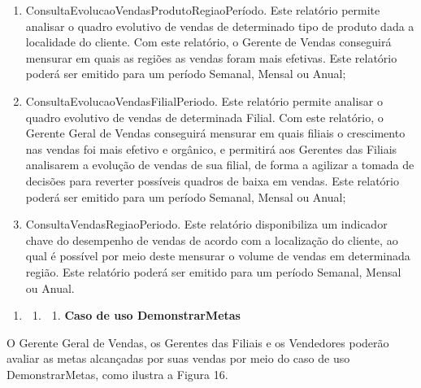 \documentclass[a4paper]{article}
\newcommand\liststyleWWviiiNumi{%
\renewcommand\theenumi{\arabic{enumi}}
\renewcommand\theenumii{\arabic{enumi}.\arabic{enumii}}
\renewcommand\theenumiii{\arabic{enumi}.\arabic{enumii}.\arabic{enumiii}}
\renewcommand\theenumiv{\arabic{enumi}.\arabic{enumii}.\arabic{enumiii}.\arabic{enumiv}}
\renewcommand\labelenumi{\theenumi}
\renewcommand\labelenumii{\theenumii}
\renewcommand\labelenumiii{\theenumiii}
\renewcommand\labelenumiv{\theenumiv.}
}
\begin{document}
\begin{enumerate}
{{vendas em tr\^es classes: A, B e C; sendo a classe A correspondente aos 20\% de produtos que obtiveram o maior volume
de vendas e correspondem \`a maior parcela do faturamento da NIB Ferragens, a classe B correspondendo aos 30\% de
produtos que tiveram um volume razo\'avel de vendas e impactaram de alguma forma mediana no faturamento da NIB
Ferragens e a classe C que corresponde aos 50\% de produtos que tiveram pouca ou nenhuma relev\^ancia no volume de
vendas da empresa. Este relat\'orio poder\'a ser emitido para um per\'iodo Semanal, Mensal ou Anual;}}
\item {
\textsf{ConsultaEvolucaoVendasProdutoRegiaoPer\'iodo. Este relat\'orio permite analisar o quadro evolutivo de vendas de
determinado tipo de produto dada a localidade do cliente. Com este relat\'orio, o Gerente de Vendas conseguir\'a
mensurar em quais as regi\~oes as vendas foram mais efetivas. Este relat\'orio poder\'a ser emitido para um per\'iodo
Semanal, Mensal ou Anual;}}
\item {
\textsf{ConsultaEvolucaoVendasFilialPeriodo. Este relat\'orio permite analisar o quadro evolutivo de vendas de
determinada Filial. Com este relat\'orio, o Gerente Geral de Vendas conseguir\'a mensurar em quais filiais o
crescimento nas vendas foi mais efetivo e org\^anico, e permitir\'a aos Gerentes das Filiais analisarem a
evolu\c{c}\~ao de vendas de sua filial, de forma a agilizar a tomada de decis\~oes para reverter poss\'iveis quadros de
baixa em vendas. Este relat\'orio poder\'a ser emitido para um per\'iodo Semanal, Mensal ou Anual;}}
\item {
\textsf{ConsultaVendasRegiaoPeriodo. Este relat\'orio disponibiliza um indicador chave do desempenho de vendas de acordo
com a localiza\c{c}\~ao do cliente, ao qual \'e poss\'ivel por meio deste mensurar o volume de vendas em determinada
regi\~ao. Este relat\'orio poder\'a ser emitido para um per\'iodo Semanal, Mensal ou Anual. }}
\end{enumerate}
\liststyleWWviiiNumi
\begin{enumerate}
\item \begin{enumerate}
\item \begin{enumerate}
\item {
\textsf{\textbf{Caso de uso DemonstrarMetas}}}
\end{enumerate}
\end{enumerate}
\end{enumerate}
{
\textsf{O Gerente Geral de Vendas, os Gerentes das Filiais e os Vendedores poder\~ao avaliar as metas alcan\c{c}adas por
suas vendas por meio do caso de uso DemonstrarMetas, como ilustra a Figura 16.}}
\end{document}

